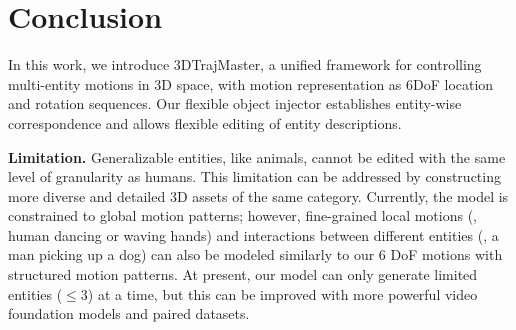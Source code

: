 \section{Conclusion}

In this work, we introduce 3DTrajMaster, a unified framework for controlling multi-entity motions in 3D space, with motion representation as 6DoF location and rotation sequences. Our flexible object injector establishes entity-wise correspondence and allows flexible editing of entity descriptions.

\noindent \textbf{Limitation.} 
Generalizable entities, like animals, cannot be edited with the same level of granularity as humans. This limitation can be addressed by constructing more diverse and detailed 3D assets of the same category. Currently, the model is constrained to global motion patterns; however, fine-grained local motions (\eg, human dancing or waving hands) and interactions between different entities (\eg, a man picking up a dog) can also be modeled similarly to our 6 DoF motions with structured motion patterns. 
At present, our model can only generate limited entities ($\leq$3) at a time, but this can be improved with more powerful video foundation models and paired datasets.
